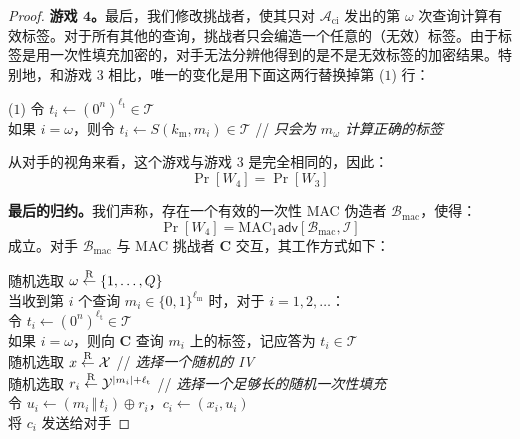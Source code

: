 \begin{proof}
\noindent\textbf{游戏 $\mathbf{4}$。}最后，我们修改挑战者，使其只对 $\mathcal{A}_\mathrm{ci}$ 发出的第 $\omega$ 次查询计算有效标签。对于所有其他的查询，挑战者只会编造一个任意的（无效）标签。由于标签是用一次性填充加密的，对手无法分辨他得到的是不是无效标签的加密结果。特别地，和游戏 $3$ 相比，唯一的变化是用下面这两行替换掉第 ($1$) 行：

\vspace*{10pt}

\noindent
\hspace*{7pt} ($1$)
\hspace*{22.5pt} 令 $t_i\leftarrow(0^n)^{\ell_\mathrm{t}}\in\mathcal{T}$\\
\hspace*{50pt} 如果 $i=\omega$，则令 $t_i\leftarrow S(k_\mathrm{m},m_i)\in\mathcal{T}$
\qquad // \quad \emph{只会为 $m_\omega$ 计算正确的标签}

\vspace*{10pt}

\noindent
从对手的视角来看，这个游戏与游戏 $3$ 是完全相同的，因此：
\begin{equation}\label{eq:9-16}
\Pr[W_4]=\Pr[W_3]
\end{equation}

\noindent\textbf{最后的归约。}我们声称，存在一个有效的一次性 MAC 伪造者 $\mathcal{B}_\mathrm{mac}$，使得：
\begin{equation}\label{eq:9-17}
\Pr[W_4]=
\mathrm{MAC}_1\mathsf{adv}[\mathcal{B}_\mathrm{mac},\mathcal{I}]
\end{equation}
成立。对手 $\mathcal{B}_\mathrm{mac}$ 与 MAC 挑战者 $\mathbf{C}$ 交互，其工作方式如下：

\vspace*{10pt}

\hspace*{5pt} 随机选取 $\omega\overset{\rm R}\leftarrow\{1,\dots,Q\}$\\
\hspace*{26pt} 当收到第 $i$ 个查询 $m_i\in\{0,1\}^{\ell_\mathrm{m}}$ 时，对于 $i=1,2,\dots$：\\
\hspace*{50pt} 令 $t_i\leftarrow(0^n)^{\ell_\mathrm{t}}\in\mathcal{T}$\\
\hspace*{50pt} 如果 $i=\omega$，则向 $\mathbf{C}$ 查询 $m_i$ 上的标签，记应答为 $t_i\in\mathcal{T}$\\
\hspace*{50pt} 随机选取 $x\overset{\rm R}\leftarrow\mathcal{X}$
\hspace*{114.2pt} // \quad \emph{选择一个随机的 IV}\\
\hspace*{50pt} 随机选取 $r_i\overset{\rm R}\leftarrow\mathcal{Y}^{|m_i|+\ell_\mathrm{t}}$
\hspace*{85pt} // \quad \emph{选择一个足够长的随机一次性填充}\\
\hspace*{50pt} 令 $u_i\leftarrow(m_i\,\Vert\,t_i)\oplus r_i$，$c_i\leftarrow(x_i,u_i)$\\
\hspace*{50pt} 将 $c_i$ 发送给对手


\end{proof}
